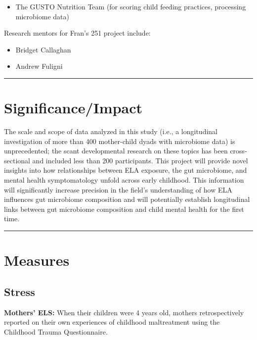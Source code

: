 \documentclass[
]{book}
\providecommand{\tightlist}{%
  \setlength{\itemsep}{0pt}\setlength{\parskip}{0pt}}
\begin{document}
\begin{itemize}
\tightlist
\item
  The GUSTO Nutrition Team (for scoring child feeding practices, processing microbiome data)
\end{itemize}

Research mentors for Fran's 251 project include:

\begin{itemize}
\tightlist
\item
  Bridget Callaghan
\item
  Andrew Fuligni
\end{itemize}

\begin{center}\rule{0.5\linewidth}{0.5pt}\end{center}

\hypertarget{significanceimpact}{%
\section{Significance/Impact}\label{significanceimpact}}

The scale and scope of data analyzed in this study (i.e., a longitudinal investigation of more than 400 mother-child dyads with microbiome data) is unprecedented; the scant developmental research on these topics has been cross-sectional and included less than 200 participants. This project will provide novel insights into how relationships between ELA exposure, the gut microbiome, and mental health symptomatology unfold across early childhood. This information will significantly increase precision in the field's understanding of how ELA influences gut microbiome composition and will potentially establish longitudinal links between gut microbiome composition and child mental health for the first time.

\begin{center}\rule{0.5\linewidth}{0.5pt}\end{center}

\hypertarget{measures}{%
\section{Measures}\label{measures}}

\hypertarget{stress}{%
\subsection{Stress}\label{stress}}

\textbf{Mothers' ELS:} When their children were 4 years old, mothers retrospectively reported on their own experiences of childhood maltreatment using the Childhood Trauma Questionnaire.
\end{document}
